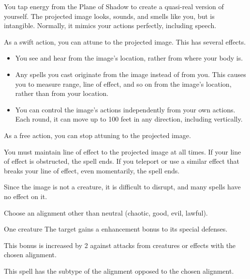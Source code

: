 \begin{spellheader}
    \spellrng{\rngmed}
    \spelldur{\durmed \dismissable}
\end{spellheader}
\begin{spelleffects}
    \spellline
    \spelleffect You tap energy from the Plane of Shadow to create a quasi-real version of yourself. The projected image looks, sounds, and smells like you, but is intangible. Normally, it mimics your actions perfectly, including speech.
    \par As a swift action, you can attune to the projected image. This has several effects.
    \begin{itemize}
        \item You see and hear from the image's location, rather from where your body is.
        \item Any spells you cast originate from the image instead of from you. This causes you to measure range, line of effect, and so on from the image's location, rather than from your location.
        \item You can control the image's actions independently from your own actions. Each round, it can move up to 100 feet in any direction, including vertically.
    \end{itemize}

    As a free action, you can stop attuning to the projected image.

\end{spelleffects}
\begin{spellfooter}
    \spellnotes You must maintain line of effect to the projected image at all times. If your line of effect is obstructed, the spell ends. If you teleport or use a similar effect that breaks your line of effect, even momentarily, the spell ends.

    Since the image is not a creature, it is difficult to disrupt, and many spells have no effect on it.
\end{spellfooter}

\begin{spellheader}
    \spellrng{\rngclose}
    \spelldur{\durshort \dismissable}
    \spellspecial Choose an alignment other than neutral (chaotic, good, evil, lawful).
\end{spellheader}
\begin{spelleffects}
    \begin{spelltarget}{One creature}
        \spelleffect The target gains a  enhancement bonus to its special defenses. \spellbonusscalingdescription

        This bonus is increased by 2 against attacks from creatures or effects with the chosen alignment.
    \end{spelltarget}
\end{spelleffects}
\begin{spellfooter}
    \spellnotes This spell has the subtype of the alignment opposed to the chosen alignment.
\end{spellfooter}

